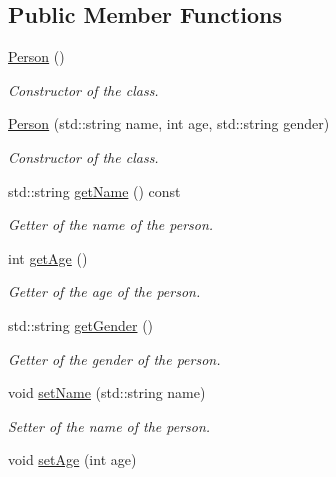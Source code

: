 \subsection*{Public Member Functions}
\begin{DoxyCompactItemize}
\item 
\mbox{\label{class_person_a0397c6f89fafc12e738923f612bc41a3}} 
\mbox{\hyperlink{class_person_a0397c6f89fafc12e738923f612bc41a3}{Person}} ()
\begin{DoxyCompactList}\small\item\em Constructor of the class. \end{DoxyCompactList}\item 
\mbox{\hyperlink{class_person_a19ba5bb7e92c776268b3d453b4ef55b2}{Person}} (std\+::string name, int age, std\+::string gender)
\begin{DoxyCompactList}\small\item\em Constructor of the class. \end{DoxyCompactList}\item 
std\+::string \mbox{\hyperlink{class_person_a9db2e2ccfc6cfa0d7979613ec2aaa922}{get\+Name}} () const
\begin{DoxyCompactList}\small\item\em Getter of the name of the person. \end{DoxyCompactList}\item 
int \mbox{\hyperlink{class_person_a69b1611320c68967067747c91783d883}{get\+Age}} ()
\begin{DoxyCompactList}\small\item\em Getter of the age of the person. \end{DoxyCompactList}\item 
std\+::string \mbox{\hyperlink{class_person_a66e13299dd684b80e7f8a9303c751ad5}{get\+Gender}} ()
\begin{DoxyCompactList}\small\item\em Getter of the gender of the person. \end{DoxyCompactList}\item 
void \mbox{\hyperlink{class_person_ad6e438f456d3ae6f5b477931c0a6aeba}{set\+Name}} (std\+::string name)
\begin{DoxyCompactList}\small\item\em Setter of the name of the person. \end{DoxyCompactList}\item 
void \mbox{\hyperlink{class_person_ac8ade54c27a0657c987c395ff04a9d46}{set\+Age}} (int age)

\end{DoxyCompactItemize}

